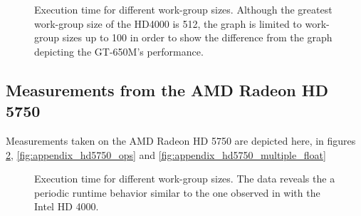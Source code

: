 \begin{figure}[p]
	\begin{center}
		\caption{Execution time for different work-group sizes. Although the greatest work-group size of the HD4000 is 512, the graph is limited to work-group sizes up to 100 in order to show the difference from the graph depicting the GT-650M's performance.}
		\label{fig:appendix_hd4000_wgsize}
	\end{center}
\end{figure}

\subsection{Measurements from the AMD Radeon HD 5750}
Measurements taken on the AMD Radeon HD 5750 are depicted here, in figures \ref{fig:appendix_hd5750_wgsize}, \ref{fig:appendix_hd5750_ops} and \ref{fig:appendix_hd5750_multiple_float}

\begin{figure}[p]
	\begin{center}
		\caption{Execution time for different work-group sizes. The data reveals the a periodic runtime behavior similar to the one observed in with the Intel HD 4000.}
		\label{fig:appendix_hd5750_wgsize}
	\end{center}
\end{figure}

